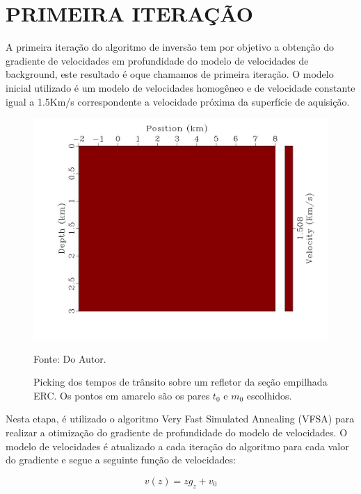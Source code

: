 \chapter{PRIMEIRA ITERAÇÃO}
\label{cap3}

A primeira iteração do algoritmo de inversão tem por objetivo a obtenção do gradiente de
velocidades em profundidade do modelo de velocidades de background, este resultado é oque
chamamos de primeira iteração. O modelo inicial utilizado é um modelo de velocidades homogêneo
e de velocidade constante igual a 1.5Km/s correspondente a velocidade próxima da superfície de aquisição. 

\begin{figure}[H]
\caption{Picking dos tempos de trânsito sobre um refletor da seção empilhada ERC. Os pontos
em amarelo são os pares $t_0$ e $m_0$ escolhidos.}
\begin{center}
\includegraphics[scale=0.3]{images/ctevel.jpeg}
\vspace{-0.3cm}
\end{center}
\begin{center}
 Fonte: Do Autor.
\end{center}
\label{fig:3.1}
\end{figure}


Nesta etapa, é utilizado o algoritmo Very Fast Simulated Annealing (VFSA) para realizar a otimização do
gradiente de profundidade do modelo de velocidades. O modelo de velocidades é atualizado a cada iteração do
algoritmo para cada valor do gradiente e segue a seguinte função de velocidades:

\begin{equation}
\label{eq:3.1}
v(z)=z g_z+v_0
\end{equation}

